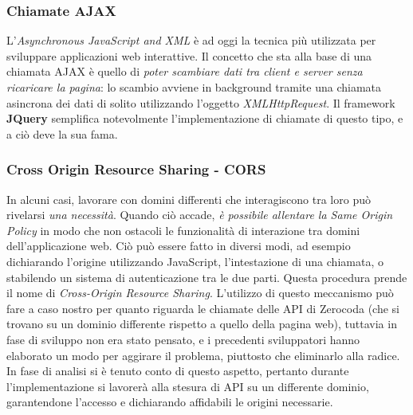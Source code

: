 \subsubsection{Chiamate AJAX}
L'\emph{Asynchronous JavaScript and XML} è ad oggi la tecnica più utilizzata per sviluppare applicazioni web interattive. Il concetto che sta alla base di una chiamata AJAX è quello di \textit{poter scambiare dati tra client e server senza ricaricare la pagina}: lo scambio avviene in background tramite una chiamata asincrona dei dati di solito utilizzando l’oggetto \textsl{XMLHttpRequest}. Il framework \textbf{JQuery} semplifica notevolmente l'implementazione di chiamate di questo tipo, e a ciò deve la sua fama.

\subsubsection{Cross Origin Resource Sharing - CORS}
In alcuni casi, lavorare con domini differenti che interagiscono tra loro può rivelarsi \textit{una necessità}. Quando ciò accade, \textit{è possibile allentare la Same Origin Policy} in modo che non ostacoli le funzionalità di interazione tra domini dell’applicazione web. Ciò può essere fatto in diversi modi, ad esempio dichiarando l'origine utilizzando JavaScript, l'intestazione di una chiamata, o stabilendo un sistema di autenticazione tra le due parti. Questa procedura prende il nome di \textit{Cross-Origin Resource Sharing}. L'utilizzo di questo meccanismo può fare a caso  nostro per quanto riguarda le chiamate delle API di Zerocoda (che si trovano su un dominio differente rispetto a quello della pagina web), tuttavia in fase di sviluppo non era stato pensato, e i precedenti sviluppatori hanno elaborato un modo per aggirare il problema, piuttosto che eliminarlo alla radice. In fase di analisi si è tenuto conto di questo aspetto, pertanto durante l'implementazione si lavorerà alla stesura di API su un differente dominio, garantendone l'accesso e dichiarando affidabili le origini necessarie.

